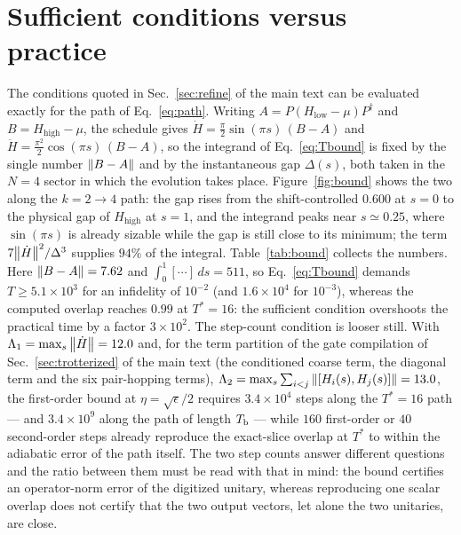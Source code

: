 \documentclass[aps,prc,reprint,superscriptaddress,floatfix,nofootinbib]{revtex4-2}
\newcommand{\Hlow}{H_{\mathrm{low}}}
\newcommand{\Hhigh}{H_{\mathrm{high}}}
\begin{document}
\section{Sufficient conditions versus practice}
\label{sm:bound}
The conditions quoted in Sec.~\ref{sec:refine} of the main text can be evaluated exactly for
the path of Eq.~\eqref{eq:path}.  Writing $A=P(\Hlow-\mu)P^\dagger$ and
$B=\Hhigh-\mu$, the schedule gives
$\dot H=\tfrac{\pi}{2}\sin(\pi s)\,(B-A)$ and
$\ddot H=\tfrac{\pi^2}{2}\cos(\pi s)\,(B-A)$, so the integrand of
Eq.~\eqref{eq:Tbound} is fixed by the single number $\norm{B-A}$ and by the
instantaneous gap $\Delta(s)$, both taken in the $N=4$ sector in which the
evolution takes place.  Figure~\ref{fig:bound} shows the two along the
$k=2\to4$ path: the gap rises from the shift-controlled $0.600$ at $s=0$ to
the physical gap of $\Hhigh$ at $s=1$, and the integrand peaks near
$s\simeq0.25$, where $\sin(\pi s)$ is already sizable while the gap is still
close to its minimum; the term $7\norm{\dot H}^2/\Delta^3$ supplies $94\%$ of
the integral.  Table~\ref{tab:bound} collects the numbers.  Here
$\norm{B-A}=7.62$ and $\int_0^1[\cdots]\,ds=511$, so
Eq.~\eqref{eq:Tbound} demands $T\ge5.1\times10^{3}$ for an infidelity of
$10^{-2}$ (and $1.6\times10^{4}$ for $10^{-3}$), whereas the computed overlap
reaches $0.99$ at $T^{*}=16$: the sufficient condition overshoots the
practical time by a factor $3\times10^{2}$.  The step-count condition is
looser still.  With $\Lambda_1=\max_s\norm{\dot H}=12.0$ and, for the term
partition of the gate compilation of Sec.~\ref{sec:trotterized} of the main text (the
conditioned coarse term, the diagonal term and the six pair-hopping terms),
$\Lambda_2=\max_s\sum_{i<j}\norm{[H_i(s),H_j(s)]}=13.0$, the first-order
bound at $\eta=\sqrt{\epsilon}/2$ requires $3.4\times10^{4}$ steps along the
$T^{*}=16$ path --- and $3.4\times10^{9}$ along the path of length $T_{\rm b}$
--- while $160$ first-order or $40$ second-order steps already reproduce the
exact-slice overlap at $T^{*}$ to within the adiabatic error of the path
itself.  The two step counts answer different questions and the ratio
between them must be read with that in mind: the bound certifies an
operator-norm error of the digitized unitary, whereas reproducing one
scalar overlap does not certify that the two output vectors, let alone the
two unitaries, are close.
\end{document}
